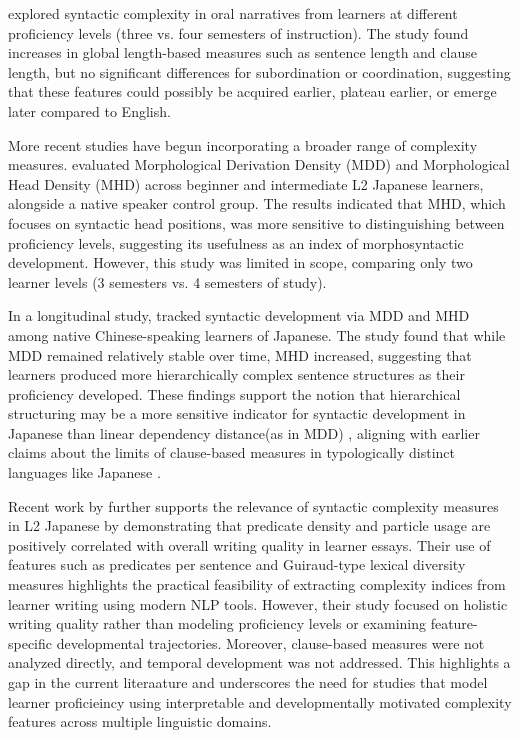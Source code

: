 \cite{Iwashita2006} explored syntactic complexity in oral narratives from learners at different proficiency levels (three vs. four semesters of instruction). The study found increases in global length-based measures such as sentence
length and clause length, but no significant differences for subordination or coordination, suggesting that these
features could possibly be acquired earlier, plateau earlier, or emerge later compared to English.

More recent studies have begun incorporating a broader range of complexity measures. \citet{komori2019} evaluated
Morphological Derivation Density (MDD) and Morphological Head Density (MHD) across beginner and intermediate L2
Japanese learners, alongside a native speaker control group. The results indicated that MHD, which focuses on
syntactic head positions, was more sensitive to distinguishing between proficiency levels, suggesting its usefulness
as an index of morphosyntactic development. However, this study was limited in scope, comparing only two learner
levels (3 semesters vs. 4 semesters of study).

In a longitudinal study, \citet{Yang2023} tracked syntactic development via MDD and MHD among native Chinese-speaking
learners of Japanese. The study found that while MDD remained relatively stable over time, MHD increased, suggesting
that learners produced more hierarchically complex sentence structures as their proficiency developed. These
findings support the notion that hierarchical structuring may be a more sensitive indicator for syntactic development
in Japanese than linear dependency distance(as in MDD) , aligning with earlier claims about the limits of
clause-based measures in typologically distinct languages like Japanese \citep{Iwashita2006}.

Recent work by \citet{obata2025} further supports the relevance of syntactic complexity measures in L2
Japanese by demonstrating that predicate density and particle usage are positively correlated with overall writing
quality in learner essays. Their use of features such as predicates per sentence and Guiraud-type lexical diversity
measures highlights the practical feasibility of extracting complexity indices from learner writing using modern NLP
tools. However, their study focused on holistic writing quality rather than modeling proficiency levels or examining
feature-specific developmental trajectories. Moreover, clause-based measures were not analyzed directly, and
temporal development was not addressed. This highlights a gap in the current literaature and underscores the need for
studies that model learner proficieincy using interpretable and developmentally motivated complexity features across
multiple linguistic domains.

